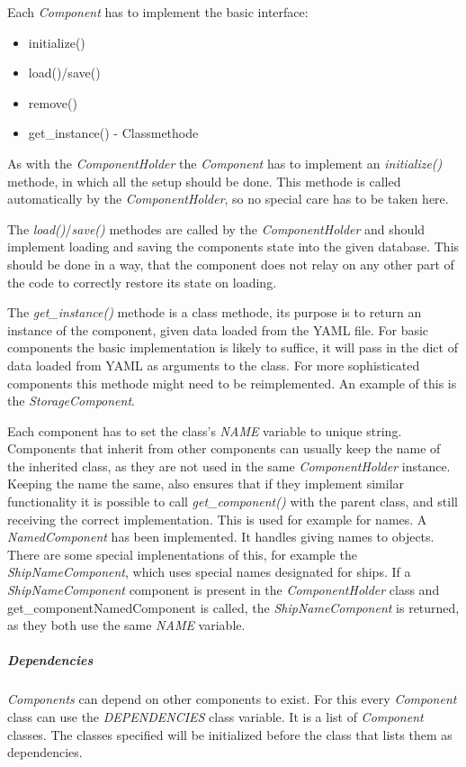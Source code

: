 Each \textit{Component} has to implement the basic interface:
\begin{itemize}
    \item initialize()
    \item load()/save()
    \item remove()
    \item get\_instance() - Classmethode
\end{itemize}
As with the \textit{ComponentHolder} the \textit{Component} has to implement an \textit{initialize()} methode, in which
all the setup should be done. This methode is called automatically by the \textit{ComponentHolder}, so no special care
has to be taken here.

The \textit{load()}/\textit{save()} methodes are called by the \textit{ComponentHolder} and should
implement loading and saving the components state into the given database. This should be done in a way, that the
component does not relay on any other part of the code to correctly restore its state on loading.

The \textit{get\_instance()} methode is a class methode, its purpose is to return an instance of the component, given data loaded
from the YAML file. For basic components the basic implementation is likely to suffice, it will pass in the dict of data
loaded from YAML as arguments to the class. For more sophisticated components this methode might need to be
reimplemented. An example of this is the \textit{StorageComponent}.

Each component has to set the class's \textit{NAME} variable to unique string. Components that inherit from other
components can usually keep the name of the inherited class, as they are not used in the same \textit{ComponentHolder}
instance. Keeping the name the same, also ensures that if they implement similar functionality it is possible to call
\textit{get\_component()} with the parent class, and still receiving the correct implementation. This is used for example
for names. A \textit{NamedComponent} has been implemented. It handles giving names to objects. There are some special
implenentations of this, for example the \textit{ShipNameComponent}, which uses special names designated for ships. If a
\textit{ShipNameComponent} component is present in the \textit{ComponentHolder} class and get\_component{NamedComponent}
is called, the \textit{ShipNameComponent} is returned, as they both use the same \textit{NAME} variable.

\subparagraph{Dependencies}
\textit{Components} can depend on other components to exist. For this every \textit{Component} class can use the
\textit{DEPENDENCIES} class variable. It is a list of \textit{Component} classes. The classes specified will be
initialized before the class that lists them as dependencies. 

